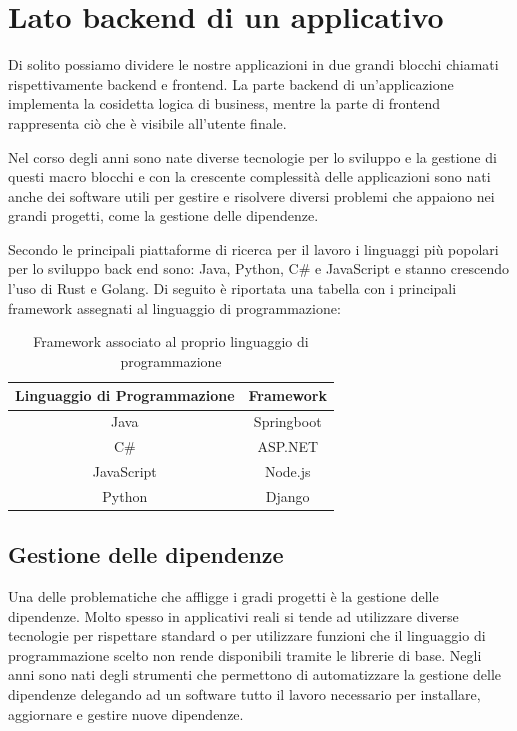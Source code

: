 \section{Lato backend di un applicativo}
Di solito possiamo dividere le nostre applicazioni in due grandi blocchi chiamati rispettivamente backend e frontend. La parte backend di un'applicazione implementa la cosidetta logica di business, mentre la parte di frontend rappresenta ciò che è visibile all'utente finale.

Nel corso degli anni sono nate diverse tecnologie per lo sviluppo e la gestione di questi macro blocchi e con la crescente complessità delle applicazioni sono nati anche dei software utili per gestire e risolvere diversi problemi che appaiono nei grandi progetti, come la gestione delle dipendenze.

Secondo le principali piattaforme di ricerca per il lavoro i linguaggi più popolari per lo sviluppo back end sono: Java, Python, C\# e JavaScript e stanno crescendo l'uso di Rust e Golang.
Di seguito è riportata una tabella con i principali framework assegnati al linguaggio di programmazione:

\begin{table}[h]
    \centering
    \begin{tabular}{| c | c |}
        \hline
       Linguaggio di Programmazione  &  Framework  \\
       \hline
       Java  & Springboot \\
       C\# & ASP.NET \\
       JavaScript & Node.js \\
       Python & Django \\
       \hline
    \end{tabular}
    \caption{Framework associato al proprio linguaggio di programmazione}
    \label{tab:backend_framework}
\end{table}

\subsection{Gestione delle dipendenze}
Una delle problematiche che affligge i gradi progetti è la gestione delle dipendenze. Molto spesso in applicativi reali si tende ad utilizzare diverse tecnologie per rispettare standard o per utilizzare funzioni che il linguaggio di programmazione scelto non rende disponibili tramite le librerie di base. Negli anni sono nati degli strumenti che permettono di automatizzare la gestione delle dipendenze delegando ad un software tutto il lavoro necessario per installare, aggiornare e gestire nuove dipendenze.

